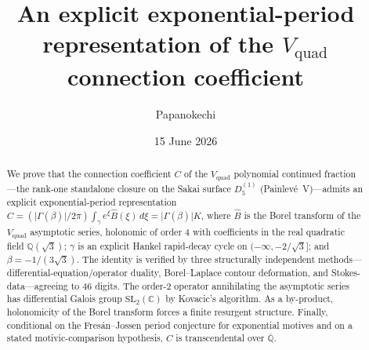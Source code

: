 \documentclass[11pt,reqno]{amsart}
\title[An exponential-period representation of the $V_{\mathrm{quad}}$ constant]%
{An explicit exponential-period representation of the $V_{\mathrm{quad}}$ connection coefficient}
\author{Papanokechi}
\date{15 June 2026}
\theoremstyle{plain}
\theoremstyle{definition}
\newcommand{\Vquad}{V_{\mathrm{quad}}}
\newcommand{\Bhat}{\widehat{B}}
\newcommand{\Qsqrt}{\mathbb{Q}(\sqrt3)}
\newcommand{\Qbar}{\overline{\mathbb{Q}}}
\newcommand{\SL}{\mathrm{SL}}
\begin{document}
\begin{abstract}
We prove that the connection coefficient $C$ of the $\Vquad$ polynomial continued fraction---the
rank-one standalone closure on the Sakai surface $D_5^{(1)}$ (Painlev\'e~V)---admits an explicit
exponential-period representation
$C=(\lvert\Gamma(\beta)\rvert/2\pi)\int_\gamma e^{\xi}\Bhat(\xi)\,d\xi=\lvert\Gamma(\beta)\rvert K$,
where $\Bhat$ is the Borel transform of the $\Vquad$ asymptotic series, holonomic of order $4$
with coefficients in the real quadratic field $\Qsqrt$; $\gamma$ is an explicit Hankel
rapid-decay cycle on $(-\infty,-2/\sqrt3]$; and $\beta=-1/(3\sqrt3)$. The identity is verified by
three structurally independent methods---differential-equation/operator duality, Borel--Laplace
contour deformation, and Stokes-data---agreeing to $46$ digits. The order-$2$ operator annihilating
the asymptotic series has differential Galois group $\SL_2(\mathbb{C})$ by Kovacic's algorithm.
As a by-product, holonomicity of the Borel transform forces a finite resurgent structure. Finally,
conditional on the Fres\'an--Jossen period conjecture for exponential motives and on a stated
motivic-comparison hypothesis, $C$ is transcendental over $\Qbar$.
\end{abstract}
\maketitle
\end{document}
